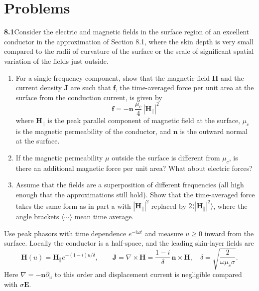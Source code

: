 
\section*{Problems}

\par\bigskip
\noindent\textbf{8.1}\quad Consider the electric and magnetic fields in the surface region of an excellent conductor in the approximation of Section 8.1, where the skin depth is very small compared to the radii of curvature of the surface or the scale of significant spatial variation of the fields just outside.
\begin{enumerate}
\item[(a)] For a single-frequency component, show that the magnetic field $\mathbf{H}$ and the current density $\mathbf{J}$ are such that $\mathbf{f}$, the time-averaged force per unit area at the surface from the conduction current, is given by
\[
\mathbf{f}=-\mathbf{n}\,\frac{\mu_{c}}{4}\,|\mathbf{H}_{\parallel}|^{2}
\]
where $\mathbf{H}_{\parallel}$ is the peak parallel component of magnetic field at the surface, $\mu_{c}$ is the magnetic permeability of the conductor, and $\mathbf{n}$ is the outward normal at the surface.
\item[(b)] If the magnetic permeability $\mu$ outside the surface is different from $\mu_{c}$, is there an additional magnetic force per unit area? What about electric forces?
\item[(c)] Assume that the fields are a superposition of different frequencies (all high enough that the approximations still hold). Show that the time-averaged force takes the same form as in part a with $|\mathbf{H}_{\parallel}|^{2}$ replaced by $2\langle|\mathbf{H}_{\parallel}|^{2}\rangle$, where the angle brackets $\langle\cdots\rangle$ mean time average.
\end{enumerate}
\solution

Use peak phasors with time dependence $e^{-i\omega t}$ and measure
$u\geq0$ inward from the surface.  Locally the conductor is a
half-space, and the leading skin-layer fields are
\[
\mathbf H(u)=\mathbf H_\parallel e^{-(1-i)u/\delta},\qquad
\mathbf J=\nabla\times\mathbf H
=\frac{1-i}{\delta}\,\mathbf n\times\mathbf H,
\quad \delta=\sqrt{\frac2{\omega\mu_c\sigma}}.
\]
Here $\nabla=-\mathbf n\partial_u$ to this order and displacement
current is negligible compared with $\sigma\mathbf E$.

